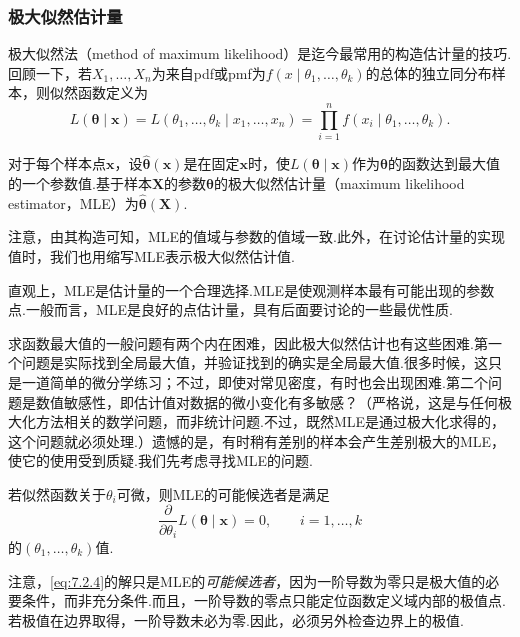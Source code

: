 \subsubsection{极大似然估计量}\label{sec:7.2.2}
极大似然法（method of maximum likelihood）是迄今最常用的构造估计量的技巧.回顾一下，若$X_1,\ldots,X_n$为来自pdf或pmf为$f(x\mid\theta_1,\ldots,\theta_k)$的总体的独立同分布样本，则似然函数定义为
\begin{equation}\label{eq:7.2.3}
L(\boldsymbol\theta\mid\boldsymbol x)=L(\theta_1,\ldots,\theta_k\mid x_1,\ldots,x_n)=\prod_{i=1}^nf(x_i\mid\theta_1,\ldots,\theta_k).
\end{equation}
\begin{definition}\label{def:7.2.4}
对于每个样本点$\boldsymbol x$，设$\widehat{\boldsymbol\theta}(\boldsymbol x)$是在固定$\boldsymbol x$时，使$L(\boldsymbol\theta\mid\boldsymbol x)$作为$\boldsymbol\theta$的函数达到最大值的一个参数值.基于样本$\boldsymbol X$的参数$\boldsymbol\theta$的极大似然估计量（maximum likelihood estimator，MLE）为$\widehat{\boldsymbol\theta}(\boldsymbol X)$.
\end{definition}
注意，由其构造可知，MLE的值域与参数的值域一致.此外，在讨论估计量的实现值时，我们也用缩写MLE表示极大似然估计值.

直观上，MLE是估计量的一个合理选择.MLE是使观测样本最有可能出现的参数点.一般而言，MLE是良好的点估计量，具有后面要讨论的一些最优性质.

求函数最大值的一般问题有两个内在困难，因此极大似然估计也有这些困难.第一个问题是实际找到全局最大值，并验证找到的确实是全局最大值.很多时候，这只是一道简单的微分学练习；不过，即使对常见密度，有时也会出现困难.第二个问题是数值敏感性，即估计值对数据的微小变化有多敏感？（严格说，这是与任何极大化方法相关的数学问题，而非统计问题.不过，既然MLE是通过极大化求得的，这个问题就必须处理.）遗憾的是，有时稍有差别的样本会产生差别极大的MLE，使它的使用受到质疑.我们先考虑寻找MLE的问题.

若似然函数关于$\theta_i$可微，则MLE的可能候选者是满足
\begin{equation}\label{eq:7.2.4}
\frac\partial{\partial\theta_i}L(\boldsymbol\theta\mid\boldsymbol x)=0,\qquad i=1,\ldots,k
\end{equation}
的$(\theta_1,\ldots,\theta_k)$值.

注意，\eqref{eq:7.2.4}的解只是MLE的\emph{可能候选者}，因为一阶导数为零只是极大值的必要条件，而非充分条件.而且，一阶导数的零点只能定位函数定义域内部的极值点.若极值在边界取得，一阶导数未必为零.因此，必须另外检查边界上的极值.

